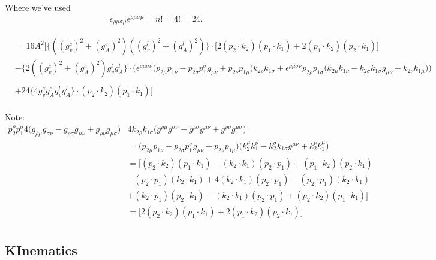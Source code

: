 \documentclass[11pt]{article}
\begin{document}
\begin{center}
Where we've used
\begin{align*}
\epsilon_{\rho \mu \sigma \mu} \epsilon^{\rho \mu \sigma \mu} = n! = 4! = 24. 
\end{align*}
\end{center}
\begin{align*}
&= 16 A^2 \Big[
 \{((g_v^e)^2 + (g_A^e)^2)  ((g_v^l)^2 + (g_A^l)^2)\} \cdot
\Big[ 2(p_2 \cdot k_2) (p_1 \cdot k_1) + 2(p_1 \cdot k_2) (p_2 \cdot k_1) \Big]\\
 &-
\{2 ((g_v^e)^2 + (g_A^e)^2) g_v^l g_A^l \} \cdot
\Big( \epsilon^{\rho \mu \sigma \nu}  \big(
p_{2\mu} p_{1 \nu} - p_{2\sigma} p_1^{ \sigma} g_{\mu\nu}
+ p_{2\nu} p_{1 \mu} \big)
k_{2 \rho} k_{1 \sigma} 
+ \epsilon^{\rho \mu \sigma \nu} p_{2 \rho}  p_{1 \sigma}  \big(k_{2 \mu} k_{1 \nu}  - k_{2 \sigma} k_{1 \sigma} g_{\mu \nu} + k_{2 \nu} k_{1 \mu}\big) \Big)\\
\\
& +
24 \{4  g_v^e g_A^e g_v^l g_A^l  \} \cdot
(p_2 \cdot k_2) (p_1 \cdot k_1)
\Big]\\
\end{align*}


Note:
\begin{align*} 
 p_2^{\rho} p_1^{\sigma} 4\big(
g_{\rho \mu} g_{\sigma \nu} 
- g_{\rho \sigma} g_{\mu \nu}
+ g_{\rho \nu} g_{\mu \sigma}
\Big)&
4k_{2\rho} k_{1\sigma}\Big(
g^{\rho \mu} g^{\sigma \nu}
- g^{\rho \sigma} g^{\mu \nu}
+ g^{\rho \nu} g^{\mu \sigma}
\Big)\\
&= 
\big(
 p_{2 \mu} p_{1 \nu} 
- p_{2 \sigma} p_1^{ \sigma} g_{\mu \nu}
+ p_{2 \nu} p_{1 \mu} 
\Big)
\Big(
k_2^{\mu} k_1^{\nu}
- k_2^{\sigma} k_{1 \sigma} g^{\mu \nu}
+ k_2^{\nu} k_1^{\mu}
\Big)\\
&= 
\Big[
(p_2 \cdot k_2) (p_1 \cdot k_1)
- (k_2 \cdot k_1) (p_2 \cdot p_1)
+ (p_1 \cdot k_2) (p_2 \cdot k_1)\\
&
- (p_2 \cdot p_1) (k_2 \cdot k_1)
+ 4(k_2 \cdot k_1) (p_2 \cdot p_1)
- (p_2 \cdot p_1) (k_2 \cdot k_1)\\
& 
+(k_2 \cdot p_1) (p_2 \cdot k_1)
- (k_2 \cdot k_1) (p_2 \cdot p_1)
+ (p_2 \cdot k_2) (p_1 \cdot k_1) \Big]\\
&= 
\Big[
2(p_2 \cdot k_2) (p_1 \cdot k_1)
+ 2(p_1 \cdot k_2) (p_2 \cdot k_1) \Big]\\
\end{align*}

\subsection*{KInematics}
\end{document}
